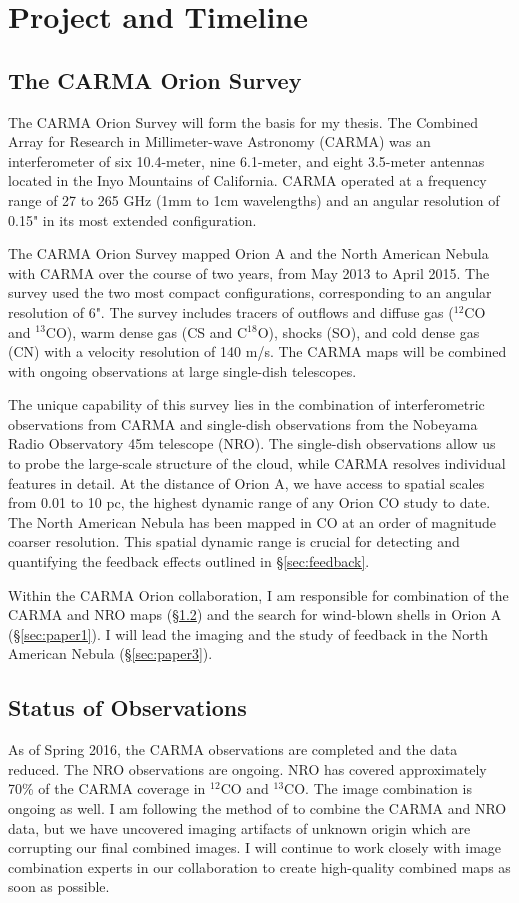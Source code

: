 \section{Project and Timeline}\label{sec:project}
    \subsection{The CARMA Orion Survey}\label{sec:carma}
    The CARMA Orion Survey will form the basis for my thesis. The Combined Array for Research in Millimeter-wave Astronomy (CARMA) was an interferometer of six 10.4-meter, nine 6.1-meter, and eight 3.5-meter antennas located in the Inyo Mountains of California. CARMA operated at a frequency range of 27 to 265 GHz (1mm to 1cm wavelengths) and an angular resolution of 0.15" in its most extended configuration.
    
    The CARMA Orion Survey mapped Orion A and the North American Nebula with CARMA over the course of two years, from May 2013 to April 2015. The survey used the two most compact configurations, corresponding to an angular resolution of 6". The survey includes tracers of outflows and diffuse gas ($^12$CO and $^13$CO), warm dense gas (CS and C$^18$O), shocks (SO), and cold dense gas (CN) with a velocity resolution of 140 m/s. The CARMA maps will be combined with ongoing observations at large single-dish telescopes. %
    
    The unique capability of this survey lies in the combination of interferometric observations from CARMA and single-dish observations from the Nobeyama Radio Observatory 45m telescope (NRO). The single-dish observations allow us to probe the large-scale structure of the cloud, while CARMA resolves individual features in detail. At the distance of Orion A, we have access to spatial scales from 0.01 to 10 pc, the highest dynamic range of any Orion CO study to date. The North American Nebula has been mapped in CO at an order of magnitude coarser resolution. This spatial dynamic range is crucial for detecting and quantifying the feedback effects outlined in \S\ref{sec:feedback}.
    
Within the CARMA Orion collaboration, I am responsible for combination of the CARMA and NRO maps (\S\ref{sec:status}) and the search for wind-blown shells in Orion A (\S\ref{sec:paper1}). I will lead the imaging and the study of feedback in the North American Nebula (\S\ref{sec:paper3}). 

    \subsection{Status of Observations}\label{sec:status}
    As of Spring 2016, the CARMA observations are completed and the data reduced. The NRO observations are ongoing. NRO has covered approximately 70\% of the CARMA coverage in $^{12}$CO and $^{13}$CO. The image combination is ongoing as well. I am following the method of \citet{Koda11} to combine the CARMA and NRO data, but we have uncovered imaging artifacts of unknown origin which are corrupting our final combined images. I will continue to work closely with image combination experts in our collaboration to create high-quality combined maps as soon as possible.
    
